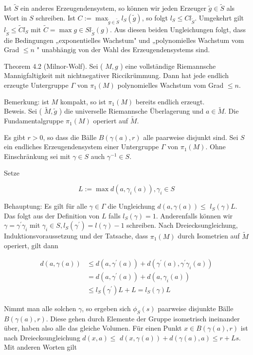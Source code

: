 \documentclass[10pt]{article}
\begin{document}
Ist $\widetilde{S}$ ein anderes Erzeugendensystem, so können wir jeden Erzeuger $\tilde{g} \in \tilde{S}$ als Wort in $S$ schreiben. Ist $C:=\max _{\tilde{g} \in \tilde{S}} l_{S}(\tilde{g})$, so folgt $l_{S} \leq C l_{\tilde{S}}$. Umgekehrt gilt $l_{\tilde{S}} \leq \tilde{C} l_{S}$ mit $\tilde{C}=\max g \in S l_{\tilde{S}}(g)$. Aus diesen beiden Ungleichungen folgt, dass die Bedingungen „exponentielles Wachstum" und „polynomielles Wachstum vom Grad $\leq n$ " unabhängig von der Wahl des Erzeugendensystems sind.

Theorem 4.2 (Milnor-Wolf). Sei ( $M, g$ ) eine vollständige Riemannsche Mannigfaltigkeit mit nichtnegativer Riccikrümmung. Dann hat jede endlich erzeugte Untergruppe $\Gamma$ von $\pi_{1}(M)$ polynomielles Wachstum vom Grad $\leq n$.

Bemerkung: ist $M$ kompakt, so ist $\pi_{1}(M)$ bereits endlich erzeugt.\\
Beweis. Sei ( $\tilde{M}, \tilde{g}$ ) die universelle Riemannsche Überlagerung und $a \in \tilde{M}$. Die Fundamentalgruppe $\pi_{1}(M)$ operiert auf $\tilde{M}$.

Es gibt $r>0$, so dass die Bälle $B(\gamma(a), r)$ alle paarweise disjunkt sind. Sei $S$ ein endliches Erzeugendensystem einer Untergruppe $\Gamma$ von $\pi_{1}(M)$. Ohne Einschränkung sei mit $\gamma \in S$ auch $\gamma^{-1} \in S$.

Setze

$$
L:=\max d\left(a, \gamma_{i}(a)\right), \gamma_{i} \in S
$$

Behauptung: Es gilt für alle $\gamma \in \Gamma$ die Ungleichung $d(a, \gamma(a)) \leq$ $l_{S}(\gamma) L$. Das folgt aus der Definition von $L$ falls $l_{S}(\gamma)=1$. Anderenfalls können wir $\gamma=\gamma^{\prime} \gamma_{i}$ mit $\gamma_{i} \in S, l_{S}\left(\gamma^{\prime}\right)=l(\gamma)-1$ schreiben. Nach Dreiecksungleichung, Induktionsvoraussetzung und der Tatsache, dass $\pi_{1}(M)$ durch Isometrien auf $\tilde{M}$ operiert, gilt dann

$$
\begin{aligned}
d(a, \gamma(a)) & \leq d\left(a, \gamma^{\prime}(a)\right)+d\left(\gamma^{\prime}(a), \gamma^{\prime} \gamma_{i}(a)\right) \\
& =d\left(a, \gamma^{\prime}(a)\right)+d\left(a, \gamma_{i}(a)\right) \\
& \leq l_{S}\left(\gamma^{\prime}\right) L+L=l_{S}(\gamma) L
\end{aligned}
$$

Nimmt man alle solchen $\gamma$, so ergeben sich $\phi_{S}(s)$ paarweise disjunkte Bälle $B(\gamma(a), r)$. Diese gehen durch Elemente der Gruppe isometrisch ineinander über, haben also alle das gleiche Volumen. Für einen Punkt $x \in B(\gamma(a), r)$ ist nach Dreiecksungleichung $d(x, a) \leq$ $d(x, \gamma(a))+d(\gamma(a), a) \leq r+L s$. Mit anderen Worten gilt
\end{document}
